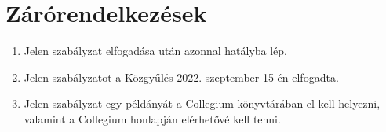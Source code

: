 \documentclass{../styles/rulebook}
\begin{document}
\section{Zárórendelkezések}

\begin{enumerate}
	\item Jelen szabályzat elfogadása után azonnal hatályba lép.
	\item Jelen szabályzatot a Közgyűlés 2022. szeptember 15-én elfogadta.
	\item Jelen szabályzat egy példányát a Collegium könyvtárában el kell helyezni, valamint a Collegium honlapján elérhetővé kell tenni.
\end{enumerate}
\end{document}
